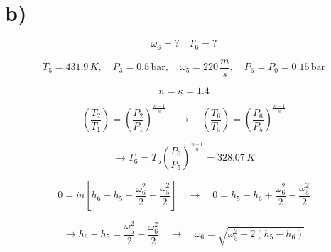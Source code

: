 \section*{b)}

\[
\omega_6 = ? \quad T_6 = ?
\]

\[
T_5 = 431.9 \, K, \quad P_3 = 0.5 \, \text{bar}, \quad \omega_5 = 220 \, \frac{m}{s}, \quad P_6 = P_0 = 0.15 \, \text{bar}
\]

\[
n = \kappa = 1.4
\]

\[
\left( \frac{T_2}{T_1} \right) = \left( \frac{P_2}{P_1} \right)^{\frac{n-1}{n}} \quad \rightarrow \quad \left( \frac{T_6}{T_5} \right) = \left( \frac{P_6}{P_5} \right)^{\frac{n-1}{n}}
\]

\[
\rightarrow T_6 = T_5 \left( \frac{P_6}{P_5} \right)^{\frac{n-1}{n}} = 328.07 \, K
\]

\[
0 = \dot{m} \left[ h_6 - h_5 + \frac{\omega_6^2}{2} - \frac{\omega_5^2}{2} \right] \quad \rightarrow \quad 0 = h_5 - h_6 + \frac{\omega_6^2}{2} - \frac{\omega_5^2}{2}
\]

\[
\rightarrow h_6 - h_5 = \frac{\omega_5^2}{2} - \frac{\omega_6^2}{2} \quad \rightarrow \quad \omega_6 = \sqrt{\omega_5^2 + 2 \left( h_5 - h_6 \right)}
\]


